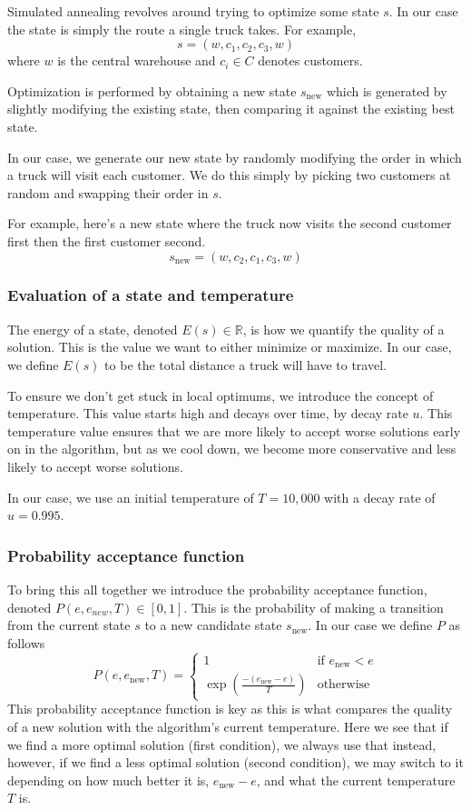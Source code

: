 \documentclass[conference]{IEEEtran}
\begin{document}
Simulated annealing revolves around trying to optimize some state $s$. In our case the state is simply the route a single truck takes. For example,
\[
    s=(w,c_1,c_2,c_3,w)
\]
where $w$ is the central warehouse and $c_i\in C$ denotes customers.

Optimization is performed by obtaining a new state $s_\text{new}$ which is generated by slightly modifying the existing state, then comparing it against the existing best state.

In our case, we generate our new state by randomly modifying the order in which a truck will visit each customer. We do this simply by picking two customers at random and swapping their order in $s$.

For example, here's a new state where the truck now visits the second customer first then the first customer second.
\[
    s_\text{new}=(w,c_2,c_1,c_3,w)
\]

\subsubsection{Evaluation of a state and temperature}

The energy of a state, denoted $E(s)\in\mathbb{R}$, is how we quantify the quality of a solution. This is the value we want to either minimize or maximize. In our case, we define $E(s)$ to be the total distance a truck will have to travel.

To ensure we don't get stuck in local optimums, we introduce the concept of temperature. This value starts high and decays over time, by decay rate $u$. This temperature value ensures that we are more likely to accept worse solutions early on in the algorithm, but as we cool down, we become more conservative and less likely to accept worse solutions.

In our case, we use an initial temperature of $T=10,000$ with a decay rate of $u=0.995$.

\subsubsection{Probability acceptance function}

To bring this all together we introduce the probability acceptance function, denoted $P(e,e_{new},T)\in[0,1]$. This is the probability of making a transition from the current state $s$ to a new candidate state $s_\text{new}$. In our case we define $P$ as follows
\[
    P(e,e_\text{new},T)=\begin{cases}
        1 & \text{if }e_\text{new}<e \\
        \displaystyle\exp\left(\frac{-(e_\text{new}-e)}{T}\right) & \text{otherwise}
    \end{cases}
\]
This probability acceptance function is key as this is what compares the quality of a new solution with the algorithm's current temperature. Here we see that if we find a more optimal solution (first condition), we always use that instead, however, if we find a less optimal solution (second condition), we may switch to it depending on how much better it is, $e_\text{new}-e$, and what the current temperature $T$ is.
\end{document}
